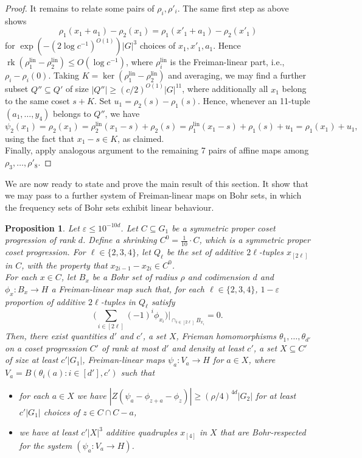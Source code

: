 \documentclass[a4paper,11pt]{article}
\numberwithin{theorem}{section}
\newtheorem{proposition}[theorem]{Proposition}
\theoremstyle{definition}
\newcommand{\on}[1]{
	\operatorname{#1}
}
\begin{document}
\begin{proof}
    It remains to relate some pairs of $\rho_i, \rho'_i$. The same first step as above shows
    \[\rho_1(x_1 + a_1) - \rho_2(x_1) = \rho_1(x'_1 + a_1) - \rho_2(x'_1)\]
    for $\exp(-(2\log c^{-1})^{O(1)})|G|^3$ choices of $x_1, x'_1, a_1$. Hence $\on{rk} (\rho^{\text{lin}}_1 - \rho^{\text{lin}}_2) \leq O(\log c^{-1})$, where $\rho^{\text{lin}}_i$ is the Freiman-linear part, i.e., $\rho_i - \rho_i(0)$. Taking $K = \on{ker} (\rho^{\text{lin}}_1 - \rho^{\text{lin}}_2)$ and averaging, we may find a further subset $Q'' \subseteq Q'$ of size $|Q''| \geq (c/2)^{O(1)}|G|^{11}$, where additionally all $x_1$ belong to the same coset $s + K$. Set $u_1 = \rho_2(s) - \rho_1(s)$. Hence, whenever an 11-tuple $(a_1, \dots, y_4)$ belongs to $Q''$, we have
    \[\psi_2(x_1) = \rho_2(x_1) = \rho_2^{\text{lin}}(x_1 - s) + \rho_2(s) = \rho_1^{\text{lin}}(x_1 - s) + \rho_1(s) + u_1 = \rho_1(x_1) + u_1,\]
    using the fact that $x_1 - s \in K$, as claimed.\\
    \indent Finally, apply analogous argument to the remaining 7 pairs of affine maps among $\rho_3, \dots, \rho'_8$.
\end{proof}


We are now ready to state and prove the main result of this section. It show that we may pass to a further system of Freiman-linear maps on Bohr sets, in which the frequency sets of Bohr sets exhibit linear behaviour.

\begin{proposition}\label{bilinearBogolyubovStep}
    Let $\varepsilon \leq 10^{-10d}$. Let $C \subseteq G_1$ be a symmetric proper coset progression of rank $d$. Define a shrinking $C^0 = \frac{1}{10} \cdot C$, which is a symmetric proper coset progression. For $\ell \in \{2,3,4\}$, let $Q_\ell$ be the set of additive $2\ell$-tuples $x_{[2\ell]}$ in $C$, with the property that $x_{2i-1} - x_{2i} \in C^0$.\\
    \indent For each $x \in C$, let $B_x$ be a Bohr set of radius $\rho$ and codimension $d$ and $\phi_x : B_x \to H$ a Freiman-linear map such that, for each $\ell \in \{2,3,4\}$, $1 - \varepsilon$ proportion of additive $2\ell$-tuples in $Q_\ell$ satisfy
    \[\Big(\sum_{i \in [2\ell]} (-1)^i \phi_{x_i}\Big)|_{\cap_{i \in [2\ell]} B_{x_i}}= 0.\]
    Then, there exist quantities $d'$ and $c'$, a set $X$, Frieman homomorphisms $\theta_1, \dots, \theta_{d'}$ on a coset progression $C'$ of rank at most $d'$ and density at least $c'$, a set $X \subseteq C'$ of size at least $c'|G_1|$, Freiman-linear maps $\psi_a : V_a \to H$ for $a \in X$, where $V_a = B(\theta_i(a) : i \in [d'], c')$ such that 
    \begin{itemize}
        \item for each $a \in X$ we have $|Z(\psi_a - \phi_{z+a} - \phi_z)| \geq (\rho/4)^{4d}|G_2|$ for at least $c' |G_1|$ choices of $z \in C \cap C-a$, 
        \item we have at least $c' |X|^3$ additive quadruples $x_{[4]}$ in $X$ that are Bohr-respected for the system $(\psi_a : V_a \to H)$.
    \end{itemize}
\end{proposition}
\end{document}
